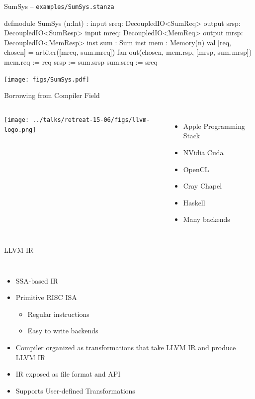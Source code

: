 \documentclass[xcolor=pdflatex,dvipsnames,table]{beamer}
\begin{document}
\begin{frame}[fragile]{SumSys -- {\tt examples/SumSys.stanza}}

{
\begin{stanza}
defmodule SumSys (n:Int) :
  input  sreq: DecoupledIO<SumReq>
  output srsp: DecoupledIO<SumResp>
  input  mreq: DecoupledIO<MemReq>
  output mrsp: DecoupledIO<MemResp>
  inst sum   : Sum
  inst mem   : Memory(n)
  val [req, chosen] = arbiter([mreq, sum.mreq])
  fan-out(chosen, mem.rsp, [mrsp, sum.mrsp])
  mem.req     := req
  srsp        := sum.srsp
  sum.sreq    := sreq
\end{stanza}
}
\begin{center}
\texttt{[image: figs/SumSys.pdf]} 
\end{center}

\end{frame}


\begin{frame}[fragile]{Borrowing from Compiler Field}
\begin{columns}
\begin{center}
\texttt{[image: ../talks/retreat-15-06/figs/llvm-logo.png]}
\end{center}
\begin{itemize}
\item Apple Programming Stack
\item NVidia Cuda
\item OpenCL  
\item Cray Chapel
\item Haskell
\item Many backends
\end{itemize}    
\end{columns}
\end{frame}

\begin{frame}[fragile]{LLVM IR}
\begin{columns}
\begin{itemize}
\item SSA-based IR
\item Primitive RISC ISA
\begin{itemize}
\item Regular instructions
\item Easy to write backends  
\end{itemize}
\item Compiler organized as transformations that take LLVM IR and produce LLVM IR
\item IR exposed as file format and API
\item Supports User-defined Transformations
\end{itemize}    
\end{columns}
\end{frame}
\end{document}
